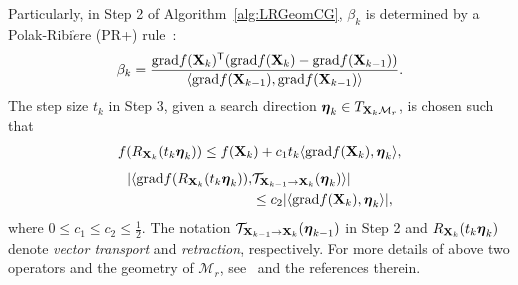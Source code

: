 \documentclass[letterpaper]{article}
\def\M{\mathcal{M}}
\def\U{{\bf U}}
\def\V{{\bf V}}
\def\diag{\mbox{diag}}
\def\bsigma{\mbox{{\boldmath $\sigma$}}}
\def\trsp{{\sf T}}
\def\G{{\bf G}}
\def\grad{{\text{grad}}}
\def\bfeta{\mbox{{\boldmath $\eta$}}}
\def\mT{{\mathcal T}}
\def\bX{{\bf X}}
\def\bX{{\bf X}}
\begin{document}
Particularly, in Step 2 of Algorithm~\ref{alg:LRGeomCG}, $\beta_{k}$ is determined by a Polak-Ribi$\grave{e}$re (PR+) rule~\cite{vandereycken2013lowrank}:
{\small
\begin{eqnarray}\label{eq:beta}
\beta_{k} = \frac{\grad f(\bX_{k})^{\trsp}(\grad f(\bX_{k}) - \grad f(\bX_{k-1}))}{\langle \grad f(\bX_{k-1}),\grad f(\bX_{k-1})\rangle}.
\end{eqnarray}
}
\noindent
The step size $t_{k}$ in Step 3, given a search direction $\bfeta_{k} \in T_{\bX_{k} \M_{r}}$, is chosen such that
{\small
\begin{align}\label{eq:choose_step_size}
  f(R_{\bX_{k}} (t_{k} \bfeta_{k})) \leq f(\bX_{k}) + c_{1} t_{k} \langle \grad f(\bX_{k}), \bfeta_{k} \rangle ,
\end{align}
}
{\small
\begin{align}\label{eq+choose_step_size2}
  | \langle \grad f(R_{\bX_{k}} (t_{k} \bfeta_{k})), & \mT_{\bX_{k-1} \rightarrow \bX_{k}} (\bfeta_{k}) \rangle |  \nonumber \\
                           & \leq c_{2} | \langle \grad f(\bX_{k}), \bfeta_{k} \rangle |  ,
\end{align}
}
\noindent
where $0 \leq c_{1} \leq c_{2} \leq \frac{1}{2}$.
The notation $\mT_{\bX_{k-1} \rightarrow \bX_{k}} (\bfeta_{k-1})$ in Step 2 and $R_{\bX_{k}} (t_k \bfeta_{k})$ denote \emph{vector transport} and \emph{retraction}, respectively.
For more details of above two operators and the geometry of $\M_{r}$, see~\cite{vandereycken2013lowrank} and the references therein.


\end{document}

